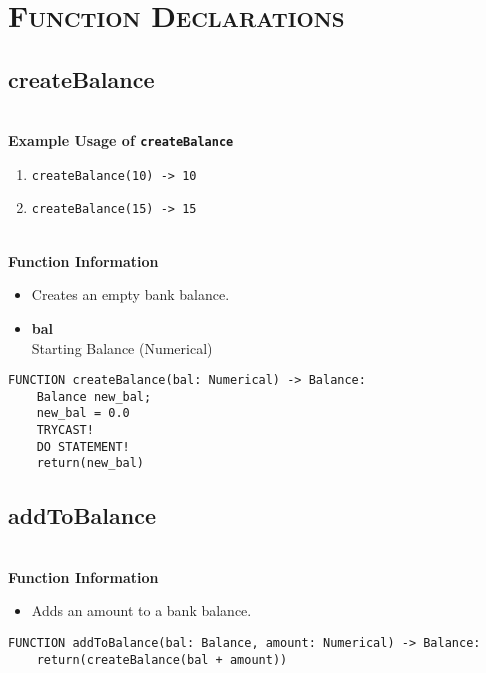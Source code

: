 
\section{\textsc{Function Declarations}}
\clearpage

\subsection{createBalance}
\textbf{ \\ Example Usage of \texttt{createBalance}}
\begin{enumerate}
	\setlength{\itemsep}{5pt}
	\setlength{\parskip}{0pt}
	\setlength{\parsep}{0pt}
	\item \verb|createBalance(10) -> 10|
	\item \verb|createBalance(15) -> 15|
\end{enumerate}

\textbf{ \\ Function Information}
\begin{itemize}
	\setlength{\itemsep}{5pt}
	\setlength{\parskip}{0pt}
	\setlength{\parsep}{0pt}
	\item Creates an empty bank balance.
	\item \textbf{bal} \\ Starting Balance (Numerical)
\end{itemize}

\begin{verbatim}
FUNCTION createBalance(bal: Numerical) -> Balance:
	Balance new_bal;
	new_bal = 0.0
	TRYCAST!
	DO STATEMENT!
	return(new_bal)
\end{verbatim}

\clearpage

\subsection{addToBalance}
\textbf{ \\ Function Information}
\begin{itemize}
	\setlength{\itemsep}{5pt}
	\setlength{\parskip}{0pt}
	\setlength{\parsep}{0pt}
	\item Adds an amount to a bank balance.
\end{itemize}

\begin{verbatim}
FUNCTION addToBalance(bal: Balance, amount: Numerical) -> Balance:
	return(createBalance(bal + amount))
\end{verbatim}

